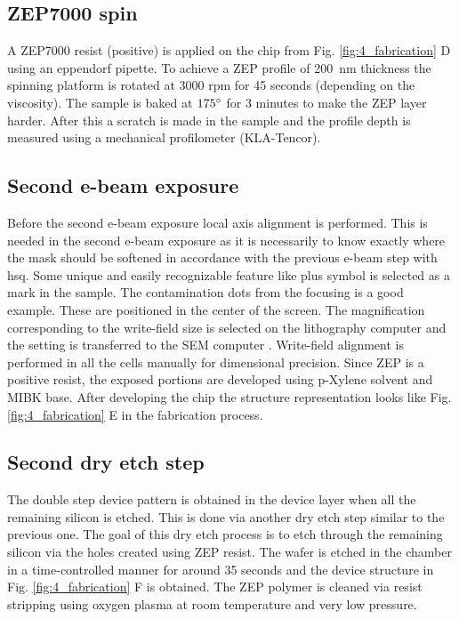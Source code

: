 \documentclass[../report.tex]{subfiles}
\begin{document}
\subsection{ZEP7000 spin}
A ZEP7000 resist (positive) is applied on the chip from Fig. \ref{fig:4_fabrication} D using an eppendorf pipette. To achieve a ZEP profile of \SI{200}{\nano \meter} thickness the spinning platform is rotated at 3000 rpm for 45 seconds (depending on the viscosity). The sample is baked at $\mathrm{175^{\circ}}$ for 3 minutes to make the ZEP layer harder. After this a scratch is made in the sample and the profile depth is measured using a mechanical profilometer (KLA-Tencor).

\subsection{Second e-beam exposure}
Before the second e-beam exposure local axis alignment is performed. This is needed in the second e-beam exposure as it is necessarily to know exactly where the mask should be softened in accordance with the previous e-beam step with \gls{hsq}. Some unique and easily recognizable feature like plus symbol is selected as a mark in the sample. The contamination dots from the focusing is a good example. These are positioned in the center of the screen. The magnification corresponding to the write-field size is selected on the lithography computer and the setting is transferred to the SEM computer \cite{write_field}. Write-field alignment is performed in all the cells manually for dimensional precision. Since ZEP is a positive resist, the exposed portions are developed using p-Xylene solvent and MIBK base. After developing the chip the structure representation looks like Fig. \ref{fig:4_fabrication} E in the fabrication process.

\subsection{Second dry etch step}
The double step device pattern is obtained in the device layer when all the remaining silicon is etched. This is done via another dry etch step similar to the previous one. The goal of this dry etch process is to etch through the remaining silicon via the holes created using ZEP resist. The wafer is etched in the chamber in a time-controlled manner for around 35 seconds and the device structure in Fig. \ref{fig:4_fabrication} F is obtained. The ZEP polymer is cleaned via resist stripping using oxygen plasma at room temperature and very low pressure. 
\end{document}
